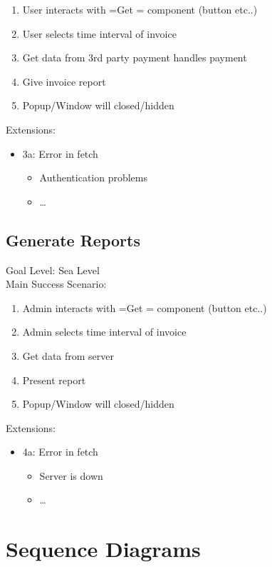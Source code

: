 \documentclass[11pt]{article}
\begin{document}
\begin{enumerate}
\item User interacts with =Get = component (button etc..)
\item User selects time interval of invoice
\item Get data from 3rd party payment handles payment
\item Give invoice report
\item Popup/Window will closed/hidden
\end{enumerate}

Extensions:  \\
\begin{itemize}
\item 3a: Error in fetch
\begin{itemize}
\item Authentication problems
\item \ldots{}
\end{itemize}
\end{itemize}
\subsection{Generate Reports}
\label{sec:org8e0a059}
Goal Level: Sea Level \\
Main Success Scenario: \\

\begin{enumerate}
\item Admin interacts with =Get = component (button etc..)
\item Admin selects time interval of invoice
\item Get data from server
\item Present report
\item Popup/Window will closed/hidden
\end{enumerate}

Extensions:
\begin{itemize}
\item 4a: Error in fetch
\begin{itemize}
\item Server is down
\item \ldots{}
\end{itemize}
\end{itemize}
\section{Sequence Diagrams}
\label{sec:org1073579}
\end{document}
